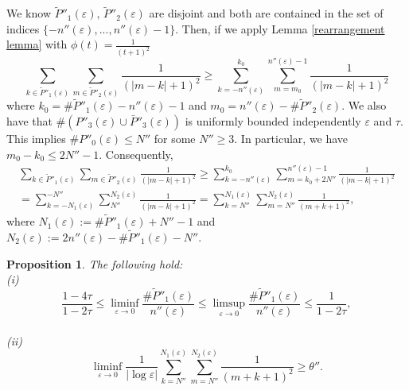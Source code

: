\documentclass[12pt]{article}
\newtheorem{proposition}[definition]{Proposition}
\numberwithin{equation}{section}
\def\e{\varepsilon}
\begin{document}
We know $\widetilde{P}''_{1}(\varepsilon),\,\widetilde{P}''_{2}(\varepsilon)$ are disjoint and both are contained in the set of indices $\{-n''(\varepsilon),...,n''(\varepsilon)-1\}$. Then, if we apply Lemma \ref{rearrangement lemma} with $\phi(t)=\frac{1}{(t+1)^{2}}$
\[
\sum_{k\in\widetilde{P}''_{1}(\varepsilon)}\sum_{m\in\widetilde{P}''_{2}(\varepsilon)}\frac{1}{(|m-k|+1)^2}\ge\sum_{k=-n''(\varepsilon)}^{k_{0}}\sum_{m=m_{0}}^{n''(\varepsilon)-1}\frac{1}{(|m-k|+1)^2}
\]
where $k_{0}=\#\widetilde{P}''_{1}(\varepsilon)-n''(\varepsilon)-1$ and $m_{0}=n''(\varepsilon)-\#\widetilde{P}''_{2}(\varepsilon)$. We also have that $\#(P''_{3}(\e)\cup\bar{P}''_{3}(\varepsilon))$ is uniformly bounded independently $\e$ and $\tau$. This implies $\#P''_{0}(\varepsilon)\le N''$ for some $N''\ge3$. In particular, we have $m_{0}-k_{0}\le2N''-1$. Consequently, 
\begin{multline*}
    \sum_{k\in\widetilde{P}''_{1}(\varepsilon)}\sum_{m\in\widetilde{P}''_{2}(\varepsilon)}\frac{1}{(|m-k|+1)^2}\ge\sum_{k=-n''(\varepsilon)}^{k_{0}}\sum_{m=k_{0}+2N''}^{n''(\varepsilon)-1}\frac{1}{(|m-k|+1)^2}\\=\sum_{k=-N_{1}(\varepsilon)}^{-N''}\sum_{N''}^{N_{2}(\varepsilon)}\frac{1}{(|m-k|+1)^2}=\sum_{k=N''}^{N_{1}(\varepsilon)}\sum_{m=N''}^{N_{2}(\varepsilon)}\frac{1}{(m+k+1)^2},
\end{multline*}
where $N_{1}(\varepsilon):=\#\widetilde{P}''_{1}(\varepsilon)+N''-1$ and $N_{2}(\varepsilon):=2n''(\varepsilon)-\#\widetilde{P}''_{1}(\varepsilon)-N''$.
\begin{proposition}\label{harmonic sum}
The following hold:\\
{\rm(i)} $$\frac{1-4\tau}{1-2\tau}\le\liminf_{\varepsilon\to0}\frac{\#\widetilde{P}''_{1}(\varepsilon)}{n''(\varepsilon)}\le\limsup_{\varepsilon\to0}\frac{\#\widetilde{P}''_{1}(\varepsilon)}{n''(\varepsilon)}\le\frac{1}{1-2\tau},$$
\\
{\rm(ii)}
$$\liminf_{\varepsilon\to0}\frac{1}{\left|\log{\varepsilon}\right|}\sum_{k=N''}^{N_{1}(\varepsilon)}\sum_{m=N''}^{N_{2}(\varepsilon)}\frac{1}{(m+k+1)^2}\ge\theta''.$$
\end{proposition}
\end{document}
